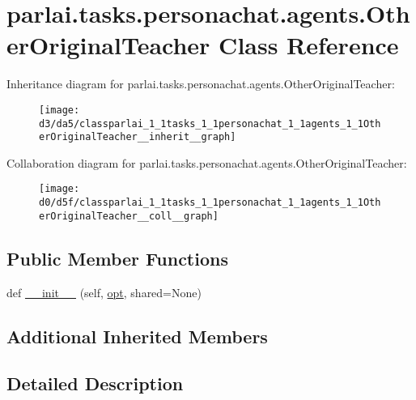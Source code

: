 \hypertarget{classparlai_1_1tasks_1_1personachat_1_1agents_1_1OtherOriginalTeacher}{}\section{parlai.\+tasks.\+personachat.\+agents.\+Other\+Original\+Teacher Class Reference}
\label{classparlai_1_1tasks_1_1personachat_1_1agents_1_1OtherOriginalTeacher}


Inheritance diagram for parlai.\+tasks.\+personachat.\+agents.\+Other\+Original\+Teacher\+:
\nopagebreak
\begin{figure}[H]
\begin{center}
\leavevmode
\texttt{[image: d3/da5/classparlai\_1\_1tasks\_1\_1personachat\_1\_1agents\_1\_1OtherOriginalTeacher\_\_inherit\_\_graph]}
\end{center}
\end{figure}


Collaboration diagram for parlai.\+tasks.\+personachat.\+agents.\+Other\+Original\+Teacher\+:
\nopagebreak
\begin{figure}[H]
\begin{center}
\leavevmode
\texttt{[image: d0/d5f/classparlai\_1\_1tasks\_1\_1personachat\_1\_1agents\_1\_1OtherOriginalTeacher\_\_coll\_\_graph]}
\end{center}
\end{figure}
\subsection*{Public Member Functions}
\begin{DoxyCompactItemize}
\item 
def \hyperlink{classparlai_1_1tasks_1_1personachat_1_1agents_1_1OtherOriginalTeacher_abd6f89edfdb5f7594fc3e63cc1c940b8}{\+\_\+\+\_\+init\+\_\+\+\_\+} (self, \hyperlink{classparlai_1_1core_1_1teachers_1_1FbDialogTeacher_af7a9ec497b9cd0292d7b8fa220da7c28}{opt}, shared=None)
\end{DoxyCompactItemize}
\subsection*{Additional Inherited Members}


\subsection{Detailed Description}


